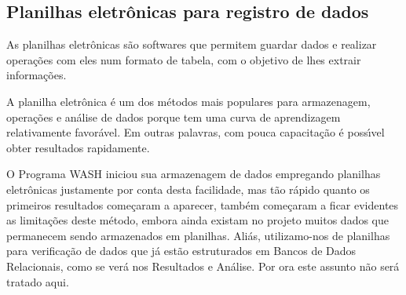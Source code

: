 \documentclass[
12pt,		%
openright,	%
twoside,  %
a4paper,			%
chapter=TITLE,		%
english,			%
french,				%
spanish,			%
brazil				%
]{USPSC-classe/USPSC}
\begin{document}
\noindent\begin{center}\mbox{\centering{}}\end{center}


\subsection[Planilhas eletr\^onicas para registro de dados]{Planilhas eletr\^onicas para registro de dados}\label{Planilhas eletr\^onicas para registro de dados}
As planilhas eletr\^onicas s\~ao softwares que permitem guardar  dados e realizar opera\c{c}\~oes com eles num formato de tabela, com o objetivo de lhes extrair informa\c{c}\~oes.

















A planilha eletr\^onica \'e um dos m\'etodos mais populares para armazenagem, opera\c{c}\~oes e an\'alise de dados porque tem uma curva de aprendizagem relativamente favor\'avel. Em outras palavras, com pouca capacita\c{c}\~ao \'e poss\'{\i}vel obter resultados rapidamente.

















O Programa WASH iniciou sua armazenagem de dados empregando planilhas eletr\^onicas justamente por conta desta facilidade, mas t\~ao r\'apido quanto os primeiros resultados come\c{c}aram a aparecer, tamb\'em come\c{c}aram a ficar evidentes as limita\c{c}\~oes deste m\'etodo, embora ainda existam no projeto muitos dados que permanecem sendo armazenados em planilhas. Ali\'as, utilizamo-nos de planilhas para verifica\c{c}\~ao de dados que j\'a est\~ao estruturados em Bancos de Dados Relacionais, como se ver\'a nos Resultados e An\'alise. Por ora este assunto n\~ao ser\'a tratado aqui.
\end{document}
